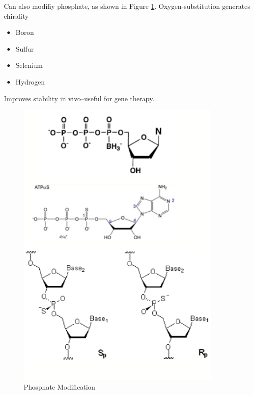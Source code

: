 \documentclass[]{article}
\begin{document}
Can also modifiy phosphate, as shown in Figure \ref{fig:PhosphateModification}. Oxygen-substitution generates chirality
\begin{itemize}
	\item Boron
	\item Sulfur
	\item Selenium
	\item Hydrogen
\end{itemize}

Improves stability in vivo--useful for gene therapy.

\begin{figure}[H]
	\caption{Phosphate Modification} \label{fig:PhosphateModification} 
	\includegraphics[width=0.9\textwidth]{PhosphateModification}
\end{figure}
\end{document}
